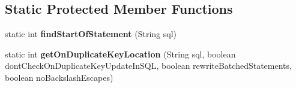 \subsection*{Static Protected Member Functions}
\begin{DoxyCompactItemize}
\item 
\mbox{\label{classcom_1_1mysql_1_1jdbc_1_1_statement_impl_ac2e4b70b1560f7878ed4b8a4f193c4ff}} 
static int {\bfseries find\+Start\+Of\+Statement} (String sql)
\item 
\mbox{\label{classcom_1_1mysql_1_1jdbc_1_1_statement_impl_a617f633a7334000c86311416626d2502}} 
static int {\bfseries get\+On\+Duplicate\+Key\+Location} (String sql, boolean dont\+Check\+On\+Duplicate\+Key\+Update\+In\+S\+QL, boolean rewrite\+Batched\+Statements, boolean no\+Backslash\+Escapes)
\end{DoxyCompactItemize}
